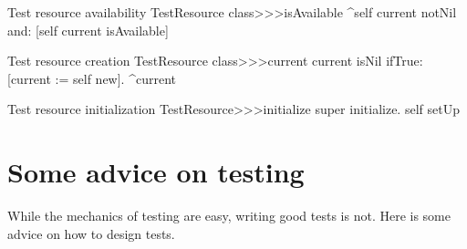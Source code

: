 \documentclass[a4paper,10pt,twoside]{book}
\begin{document}
{
\begin{method}[testresourceisavailable]{Test resource availability}
TestResource class>>>isAvailable
	^self current notNil and: [self current isAvailable]
\end{method}
\begin{method}[testresourcecurrent]{Test resource creation}
TestResource class>>>current
	current isNil ifTrue: [current := self new].
	^current
\end{method}
\begin{method}[restresourceinitialize]{Test resource initialization}
TestResource>>>initialize
	super initialize.
	self setUp
\end{method}
\section{Some advice on testing}

While the mechanics of testing are easy, writing good tests is not.
Here is some advice on how to design tests.

\begin{description}



\end{description}}
\end{document}
